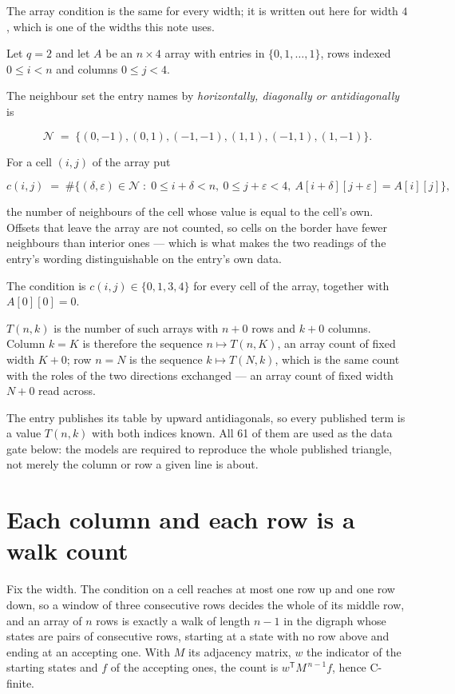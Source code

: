 \documentclass[11pt]{article}
\theoremstyle{definition}
\begin{document}
The array condition is the same for every width; it is written out here for width $4$, which is one of the widths this note uses.

Let $q = 2$ and let $A$ be an $n \times 4$ array with entries in $\{0,1,\dots,1\}$, rows indexed $0 \le i < n$ and columns $0 \le j < 4$.

The neighbour set the entry names by {\itshape horizontally, diagonally or antidiagonally} is

\[\mathcal{N} \;=\; \{(0,-1), (0,1), (-1,-1), (1,1), (-1,1), (1,-1)\}.\]

For a cell $(i,j)$ of the array put

\[c(i,j) \;=\; \#\bigl\{(\delta,\varepsilon)\in\mathcal{N} \;:\; 0\le i+\delta<n,\ 0\le j+\varepsilon<4,\ A[i+\delta][j+\varepsilon] = A[i][j]\bigr\},\]

the number of neighbours of the cell whose value is equal to the cell's own. Offsets that leave the array are not counted, so cells on the border have fewer neighbours than interior ones --- which is what makes the two readings of the entry's wording distinguishable on the entry's own data.

The condition is $c(i,j) \in \{0, 1, 3, 4\}$ for every cell of the array, together with $A[0][0]=0$.

$T(n,k)$ is the number of such arrays with $n + 0$ rows and $k + 0$ columns. Column $k = K$ is therefore the sequence $n \mapsto T(n,K)$, an array count of fixed width $K + 0$; row $n = N$ is the sequence $k \mapsto T(N,k)$, which is the same count with the roles of the two directions exchanged --- an array count of fixed width $N + 0$ read across.

The entry publishes its table by upward antidiagonals, so every published term is a value $T(n,k)$ with both indices known. All 61 of them are used as the data gate below: the models are required to reproduce the whole published triangle, not merely the column or row a given line is about.

\section{Each column and each row is a walk count}

Fix the width. The condition on a cell reaches at most one row up and one row down, so a window of three consecutive rows decides the whole of its middle row, and an array of $n$ rows is exactly a walk of length $n-1$ in the digraph whose states are pairs of consecutive rows, starting at a state with no row above and ending at an accepting one. With $M$ its adjacency matrix, $w$ the indicator of the starting states and $f$ of the accepting ones, the count is $w^{\mathsf T}M^{\,n-1}f$, hence C-finite.
\end{document}
